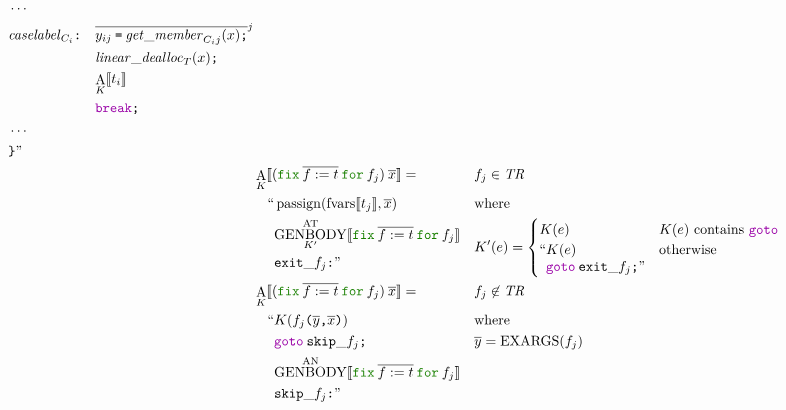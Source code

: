 \documentclass[a4paper,fleqn]{article}
\newcommand{\kwfix}{\mbox{\color{mygreen}\ttfamily fix}}
\newcommand{\kwfor}{\mbox{\color{mygreen}\ttfamily for}}
\newcommand{\ofix}[2]{\kwfix\:{#1}\:\kwfor\:{#2}}
\DeclareMathOperator{\EXARGS}{EXARGS}
\newcommand{\BRA}[1]{\llbracket #1 \rrbracket}
\DeclareMathOperator{\genbody}{GENBODY}
\newcommand{\genbodyat}[2]{\genbody^\mathrm{AT}_{#1}\BRA{#2}}
\newcommand{\genbodyan}[1]{\genbody^\mathrm{AN}\BRA{#1}}
\newcommand{\tr}{\mathit{TR}}
\newcommand{\ldq}{\text{``}}
\newcommand{\rdq}{\text{''}}
\newcommand{\ttparen}[1]{\texttt{(}#1\texttt{)}}
\newcommand{\ttrbrace}{\texttt{\char '175}}
\newcommand{\tteq}{\texttt{=}}
\newcommand{\ttsemi}{\texttt{;}}
\newcommand{\ttcomma}{\texttt{,}}
\newcommand{\ttcolon}{\texttt{:}}
\newcommand{\kwbreak}{\mbox{\color{myviolet}\ttfamily break}}
\newcommand{\kwgoto}{\mbox{\color{myviolet}\ttfamily goto}}
\DeclareMathOperator{\passign}{passign}
\DeclareMathOperator{\fvarsop}{fvars}
\newcommand{\fvars}[1]{\fvarsop\BRA{#1}}
\DeclareMathOperator{\Aop}{A}
\newcommand{\A}[2]{\Aop_{#1}\BRA{#2}}
\newcommand{\rep}[1]{\overline{#1}}
\newcommand{\repi}[2]{\overline{#1}^{#2}}
\begin{document}
\begin{align*}
\begin{alignedat}{2}
            & \cdots \\
            & \mathit{caselabel}_{C_i}\ttcolon\quad
              \begin{aligned}[t]
              & \repi{y_{ij}\:\tteq\:\mathit{get\_member}_{C_i j}(x)\ttsemi}{j} \\
              & \mathit{linear\_dealloc}_{T}(x)\ttsemi \\
              & {\A{K}{t_i}} \\
              & \kwbreak\ttsemi
              \end{aligned} \\
            & \cdots \\
            & \ttrbrace\rdq
       \end{alignedat} \\
  &\A{K}{(\ofix{\rep{f:=t}}{f_j})\:\rep{x}} =                   && f_j \in \tr \\
     & \quad\begin{alignedat}[t]{2}
       \ldq & \passign(\fvars{t_j}, \rep{x}) \\
            & {\genbodyat{K'}{\ofix{\rep{f:=t}}{f_j}}} \\
            & \mathtt{exit\_}f_j\ttcolon \rdq
       \end{alignedat} &&
               \begin{alignedat}[t]{1}
                  & \text{where} \\
                  & K'(e) =
                    \begin{cases}
                    K(e) & \text{$K(e)$ contains \kwgoto}  \\
                    \begin{aligned}[t]
                      \ldq & K(e) \\
                           & \kwgoto\:\mathtt{exit\_}f_j\ttsemi \rdq
                    \end{aligned} & \text{otherwise}
                  \end{cases}
                \end{alignedat} \\
  &\A{K}{(\ofix{\rep{f:=t}}{f_j})\:\rep{x}} =                      && f_j \not\in \tr \\
     & \quad\begin{alignedat}[t]{2}
       \ldq & K(f_j\ttparen{\rep{y}\ttcomma \rep{x}})                  \\
            & \kwgoto\:\mathtt{skip\_}f_j\ttsemi                                    \\
            & {\genbodyan{\ofix{\rep{f:=t}}{f_j}}}                          \\
            & \mathtt{skip\_}f_j\ttcolon \rdq
       \end{alignedat} &&
               \begin{alignedat}[t]{1}
                  & \text{where} \\
                  & \rep{y} = \EXARGS(f_j)
               \end{alignedat}
\end{align*}
\end{document}

